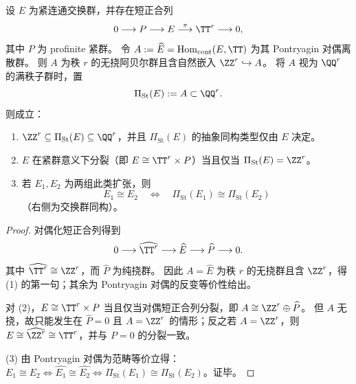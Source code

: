 \begin{proposition}\label{prop:app-profinite-torus-extension-stokes-module-classification}
设 \(E\) 为紧连通交换群，并存在短正合列
\[
0\longrightarrow P\longrightarrow E\overset{\pi}{\longrightarrow}\TT^r\longrightarrow 0,
\]
其中 \(P\) 为 profinite 紧群。
令 \(A:=\widehat E=\mathrm{Hom}_{\mathrm{cont}}(E,\TT)\) 为其 Pontryagin 对偶离散群。
则 \(A\) 为秩 \(r\) 的无挠阿贝尔群且含自然嵌入 \(\ZZ^r\hookrightarrow A\)。
将 \(A\) 视为 \(\QQ^r\) 的满秩子群时，置
\[
\Pi_{\mathrm{St}}(E):=A\subset\QQ^r.
\]
则成立：
\begin{enumerate}
  \item \(\ZZ^r\subseteq \Pi_{\mathrm{St}}(E)\subseteq \QQ^r\)，并且 \(\Pi_{\mathrm{St}}(E)\) 的抽象同构类型仅由 \(E\) 决定。
  \item \(E\) 在紧群意义下分裂（即 \(E\cong \TT^r\times P\)）当且仅当 \(\Pi_{\mathrm{St}}(E)=\ZZ^r\)。
  \item 若 \(E_1,E_2\) 为两组此类扩张，则
  \[
  E_1\cong E_2
  \quad\Longleftrightarrow\quad
  \Pi_{\mathrm{St}}(E_1)\cong \Pi_{\mathrm{St}}(E_2)
  \]
  （右侧为交换群同构）。
\end{enumerate}
\end{proposition}
\begin{proof}
对偶化短正合列得到
\[
0\longrightarrow \widehat{\TT^r}\longrightarrow \widehat E\longrightarrow \widehat P\longrightarrow 0.
\]
其中 \(\widehat{\TT^r}\cong \ZZ^r\)，而 \(\widehat P\) 为纯挠群。
因此 \(A=\widehat E\) 为秩 \(r\) 的无挠群且含 \(\ZZ^r\)，得 (1) 的第一句；其余为 Pontryagin 对偶的反变等价性给出。
\par
对 (2)，\(E\cong \TT^r\times P\) 当且仅当对偶短正合列分裂，即 \(A\cong \ZZ^r\oplus \widehat P\)。
但 \(A\) 无挠，故只能发生在 \(\widehat P=0\) 且 \(A=\ZZ^r\) 的情形；反之若 \(A=\ZZ^r\)，则 \(E\cong \widehat{\ZZ^r}\cong \TT^r\)，并与 \(P=0\) 的分裂一致。
\par
(3) 由 Pontryagin 对偶为范畴等价立得：\(E_1\cong E_2\iff \widehat{E_1}\cong \widehat{E_2}\iff \Pi_{\mathrm{St}}(E_1)\cong \Pi_{\mathrm{St}}(E_2)\)。证毕。
\end{proof}

